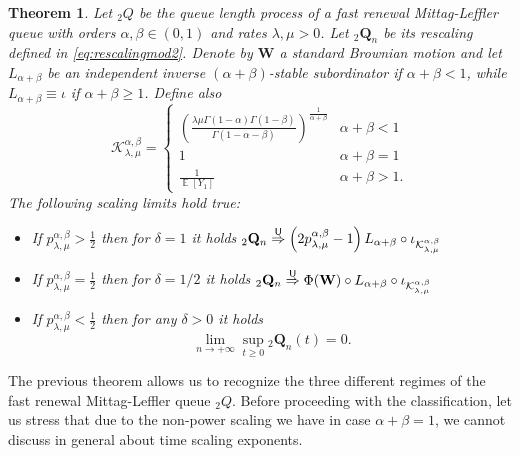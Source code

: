 \documentclass[]{amsart}
\numberwithin{equation}{section}
\newtheorem{thm}{Theorem}[section]
\theoremstyle{remark}
\theoremstyle{definition}
\DeclareMathOperator{\E}{\mathbb{E}}
\begin{document}
\begin{thm}\label{thm:fastren}
	Let ${}_2Q$ be the queue length process of a fast renewal Mittag-Leffler queue with orders $\alpha,\beta \in (0,1)$ and rates $\lambda,\mu>0$. Let ${}_2\mathbf{Q}_n$ be its rescaling defined in \eqref{eq:rescalingmod2}. Denote by $\mathbf{W}$ a standard Brownian motion and let $L_{\alpha+\beta}$ be an independent inverse $(\alpha+\beta)$-stable subordinator if $\alpha+\beta<1$, while $L_{\alpha+\beta}\equiv \iota$ if $\alpha+\beta \ge 1$. Define also
	\begin{equation}\label{eq:giantconstant}
		\mathcal{K}_{\lambda,\mu}^{\alpha,\beta}=\begin{cases} \left(\frac{\lambda \mu \Gamma(1-\alpha)\Gamma(1-\beta)}{\Gamma(1-\alpha-\beta)}\right)^{\frac{1}{\alpha+\beta}} & \alpha+\beta<1 \\
			1 & \alpha+\beta=1 \\
			\frac{1}{\E[Y_1]} & \alpha+\beta>1.
		\end{cases}
	\end{equation}
	The following scaling limits hold true:
	\begin{itemize}
		\item[(i)] If $p_{\lambda,\mu}^{\alpha,\beta}>\frac{1}{2}$ then for $\delta=1$ it holds ${}_2\mathbf{Q}_n \overset{\sf U}{\Rightarrow} \left( 2p_{\lambda,\mu}^{\alpha,\beta}-1\right)L_{\alpha+\beta}\circ \iota_{\mathcal{K}_{\lambda,\mu}^{\alpha,\beta}}$
		\item[(ii)] If $p_{\lambda,\mu}^{\alpha,\beta}=\frac{1}{2}$ then for $\delta=1/2$ it holds ${}_2\mathbf{Q}_n \overset{\sf U}{\Rightarrow} \Phi(\mathbf{W})\circ L_{\alpha+\beta}\circ \iota_{\mathcal{K}_{\lambda,\mu}^{\alpha,\beta}}$
		\item[(iii)] If $p_{\lambda,\mu}^{\alpha,\beta}<\frac{1}{2}$ then for any $\delta>0$ it holds
		\begin{equation*}
			\lim_{n \to +\infty}\sup_{t \ge 0}{}_2\mathbf{Q}_n(t)=0.
		\end{equation*}
	\end{itemize}
\end{thm}
The previous theorem allows us to recognize the three different regimes of the fast renewal Mittag-Leffler queue ${}_2{Q}$. Before proceeding with the classification, let us stress that due to the non-power scaling we have in case $\alpha+\beta=1$, we cannot discuss in general about time scaling exponents. 
\end{document}
